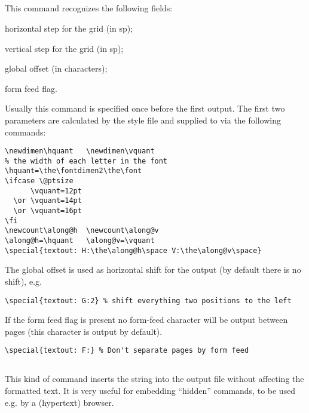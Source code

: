 \subsection*{}
 
This  command recognizes the following fields:
 
\begin{DLtt}{1}
\item[H] horizontal step for the grid (in sp);
\item[V] vertical step for the grid (in sp);
\item[G] global offset (in characters);
\item[F] form feed flag.
\end{DLtt}
 
Usually this command is specified once before the first output.
The first two parameters are calculated by the style file
 and supplied to \PTD{} via the following commands:
\begin{verbatim}
\newdimen\hquant   \newdimen\vquant
% the width of each letter in the font
\hquant=\the\fontdimen2\the\font
\ifcase \@ptsize
      \vquant=12pt
  \or \vquant=14pt
  \or \vquant=16pt
\fi
\newcount\along@h  \newcount\along@v
\along@h=\hquant   \along@v=\vquant
\special{textout: H:\the\along@h\space V:\the\along@v\space}
\end{verbatim}
 
The global offset is used as horizontal shift for the output
(by default there is no shift), e.g.
\begin{verbatim}
\special{textout: G:2} % shift everything two positions to the left
\end{verbatim}
 
If the form feed flag is present no form-feed character will be output
between pages (this character is output by default).
\begin{verbatim}
\special{textout: F:} % Don't separate pages by form feed
\end{verbatim}
 
\subsection*{}
 
This kind of  command
inserts the string  into the output file
without affecting the formatted text.
It is very useful for embedding ``hidden'' commands, to be used e.g. by a
(hypertext) browser.
 
